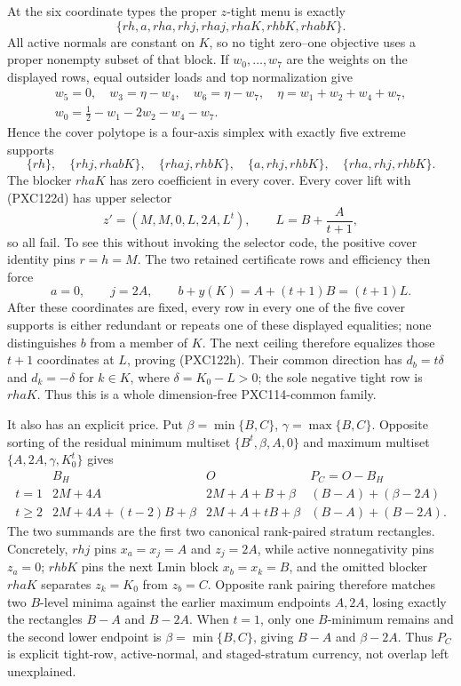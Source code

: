 \documentclass[11pt]{article}
\begin{document}
At the six coordinate types the proper \(z\)-tight menu is exactly
\[
 \{rh,a,rha,rhj,rhaj,rhaK,rhbK,rhabK\}.             \tag{PXC122e}
\]
All active normals are constant on \(K\), so no tight zero--one objective
uses a proper nonempty subset of that block.  If \(w_0,\ldots,w_7\) are the
weights on the displayed rows, equal outsider loads and top normalization
give
\begin{equation}
\begin{gathered}
 w_5=0,\quad w_3=\eta-w_4,\quad w_6=\eta-w_7,\quad
 \eta=w_1+w_2+w_4+w_7,\\
 w_0=\frac12-w_1-2w_2-w_4-w_7.
\end{gathered}
\tag{PXC122f}
\end{equation}
Hence the cover polytope is a four-axis simplex with exactly five extreme
supports
\[
 \{rh\},\quad\{rhj,rhabK\},\quad\{rhaj,rhbK\},\quad
 \{a,rhj,rhbK\},\quad\{rha,rhj,rhbK\}.             \tag{PXC122g}
\]
The blocker \(rhaK\) has zero coefficient in every cover.  Every cover lift
with (PXC122d) has upper selector
\[
 z'=(M,M,0,L,2A,L^t),\qquad L=B+\frac{A}{t+1},       \tag{PXC122h}
\]
so all fail.  To see this without invoking the selector code, the positive
cover identity pins \(r=h=M\).  The two retained certificate rows and
efficiency then force
\[
 a=0,\qquad j=2A,\qquad b+y(K)=A+(t+1)B=(t+1)L.
\]
After these coordinates are fixed, every row in every one of the five cover
supports is either redundant or repeats one of these displayed equalities;
none distinguishes \(b\) from a member of \(K\).  The next ceiling therefore
equalizes those \(t+1\) coordinates at \(L\), proving (PXC122h).
Their common direction has \(d_b=t\delta\) and
\(d_k=-\delta\) for \(k\in K\), where \(\delta=K_0-L>0\); the sole
negative tight row is \(rhaK\).  Thus this is a whole dimension-free
PXC114-common family.

It also has an explicit price.  Put
\(\beta=\min\{B,C\}\), \(\gamma=\max\{B,C\}\).  Opposite sorting of the
residual minimum multiset \(\{B^t,\beta,A,0\}\) and maximum multiset
\(\{A,2A,\gamma,K_0^t\}\) gives
\[
\begin{array}{c|c|c|c}
 &B_H&O&P_C=O-B_H\\ \hline
t=1&2M+4A&2M+A+B+\beta&(B-A)+(\beta-2A)\\
t\ge2&2M+4A+(t-2)B+\beta&2M+A+tB+\beta&(B-A)+(B-2A).
\end{array}                                             \tag{PXC123a}
\]
The two summands are the first two canonical rank-paired stratum rectangles.
Concretely, \(rhj\) pins \(x_a=x_j=A\) and \(z_j=2A\), while active
nonnegativity pins \(z_a=0\); \(rhbK\) pins the next Lmin block
\(x_b=x_k=B\), and the omitted blocker \(rhaK\) separates
\(z_k=K_0\) from \(z_b=C\).  Opposite rank pairing therefore matches two
\(B\)-level minima against the earlier maximum endpoints \(A,2A\), losing
exactly the rectangles \(B-A\) and \(B-2A\).  When \(t=1\), only one
\(B\)-minimum remains and the second lower endpoint is
\(\beta=\min\{B,C\}\), giving \(B-A\) and \(\beta-2A\).
Thus \(P_C\) is explicit tight-row, active-normal, and staged-stratum
currency, not overlap left unexplained.
\end{document}
